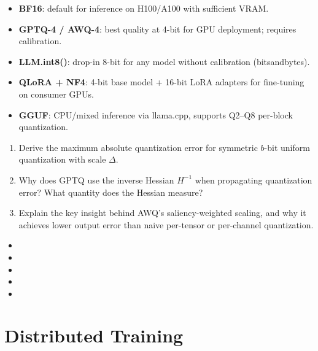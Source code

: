\documentclass[11pt,a4paper]{article}
\begin{document}
	\begin{keyconcept}
		\begin{itemize}[nosep]
			\item \textbf{BF16}: default for inference on H100/A100 with sufficient VRAM.
			\item \textbf{GPTQ-4 / AWQ-4}: best quality at 4-bit for GPU deployment; requires calibration.
			\item \textbf{LLM.int8()}: drop-in 8-bit for any model without calibration (bitsandbytes).
			\item \textbf{QLoRA + NF4}: 4-bit base model + 16-bit LoRA adapters for fine-tuning on consumer GPUs.
			\item \textbf{GGUF}: CPU/mixed inference via llama.cpp, supports Q2--Q8 per-block quantization.
		\end{itemize}
	\end{keyconcept}

	\begin{checkpoint}
		\begin{enumerate}
			\item Derive the maximum absolute quantization error for symmetric $b$-bit uniform quantization with scale $\Delta$.
			\item Why does GPTQ use the inverse Hessian $H^{-1}$ when propagating quantization error? What quantity does the Hessian measure?
			\item Explain the key insight behind AWQ's saliency-weighted scaling, and why it achieves lower output error than naive per-tensor or per-channel quantization.
		\end{enumerate}
	\end{checkpoint}

	\begin{sourcesbox}
		\small
		\begin{itemize}[nosep]
			\item {}
			\item {}
			\item {}
			\item {}
			\item {}
		\end{itemize}
	\end{sourcesbox}

	\clearpage
	\section{Distributed Training}
	\label{sec:distributed-training}
\end{document}
